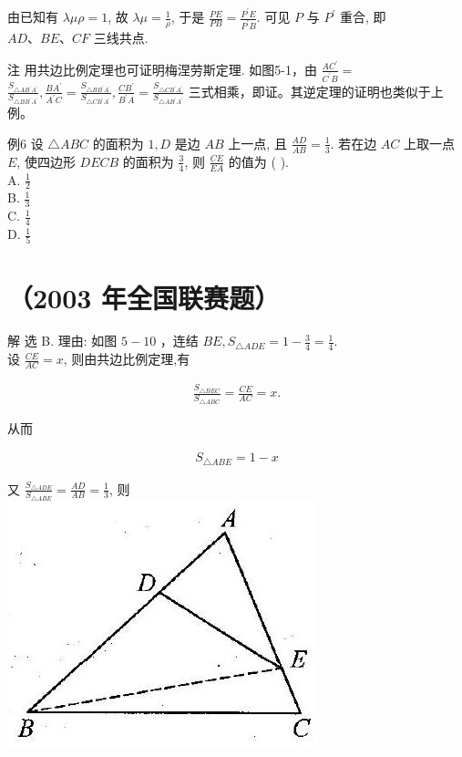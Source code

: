 \documentclass[10pt]{article}
\begin{document}
由已知有 $\lambda \mu \rho=1$, 故 $\lambda \mu=\frac{1}{\rho}$, 于是 $\frac{P E}{P B}=\frac{P^{\prime} E}{P^{\prime} B}$. 可见 $P$ 与 $P^{\prime}$ 重合, 即 $A D 、 B E 、 C F$ 三线共点.

注 用共边比例定理也可证明梅涅劳斯定理. 如图5-1，由 $\frac{A C^{\prime}}{C^{\prime} B}=$ $\frac{S_{\triangle A B^{\prime} A^{\prime}}}{S_{\triangle B B^{\prime} A^{\prime}}}, \frac{B A^{\prime}}{A^{\prime} C}=\frac{S_{\triangle B B^{\prime} A^{\prime}}}{S_{\triangle C B^{\prime} A^{\prime}}}, \frac{C B^{\prime}}{B^{\prime} A}=\frac{S_{\triangle C B^{\prime} A^{\prime}}}{S_{\triangle A B^{\prime} A^{\prime}}}$ 三式相乘，即证。其逆定理的证明也类似于上例。

例6 设 $\triangle A B C$ 的面积为 $1, D$ 是边 $A B$ 上一点, 且 $\frac{A D}{A B}=\frac{1}{3}$. 若在边 $A C$ 上取一点 $E$, 使四边形 $D E C B$ 的面积为 $\frac{3}{4}$, 则 $\frac{C E}{E A}$ 的值为 ( ).\\
A. $\frac{1}{2}$\\
B. $\frac{1}{3}$\\
C. $\frac{1}{4}$\\
D. $\frac{1}{5}$

\section*{（2003 年全国联赛题）}
解 选 B. 理由: 如图 $5-10$ ，连结 $B E, S_{\triangle A D E}=1-\frac{3}{4}=\frac{1}{4}$.\\
设 $\frac{C E}{A C}=x$, 则由共边比例定理,有

\begin{align*}
\frac{S_{\triangle B E C}}{S_{\triangle A B C}}=\frac{C E}{A C}=x .
\end{align*}

从而

\begin{align*}
S_{\triangle A B E}=1-x
\end{align*}

又 $\frac{S_{\triangle A D E}}{S_{\triangle A B E}}=\frac{A D}{A B}=\frac{1}{3}$, 则\\
\includegraphics[max width=\textwidth, center]{2024_10_30_2c8f45efd4a519b08e1ag-053}
\end{document}
